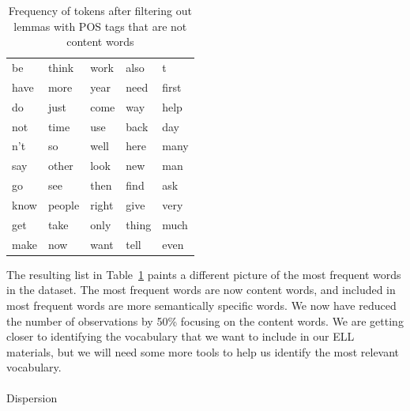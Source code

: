 \documentclass[
  letterpaper,
  krantz1]{latex/krantz-mod}
\makeatletter
\let\oldparagraph\paragraph
\renewcommand{\paragraph}{
    \@ifstar
      \xxxParagraphStar
      \xxxParagraphNoStar
  }
\newcommand{\xxxParagraphStar}[1]{\oldparagraph*{#1}\mbox{}}
\newcommand{\xxxParagraphNoStar}[1]{\oldparagraph{#1}\mbox{}}
\theoremstyle{definition}
\theoremstyle{definition}
\theoremstyle{remark}
\makeatother
\begin{document}
\begin{longtable}[]{@{}
  >{\raggedright\arraybackslash}p{}
  >{\raggedright\arraybackslash}p{}
  >{\raggedright\arraybackslash}p{}
  >{\raggedright\arraybackslash}p{}
  >{\raggedright\arraybackslash}p{}@{}}

\caption{\label{tbl-explore-masc-filter-pos}Frequency of tokens after
filtering out lemmas with POS tags that are not content words}

\tabularnewline

\toprule\noalign{}
\endhead
\bottomrule\noalign{}
\endlastfoot
be & think & work & also & t \\
have & more & year & need & first \\
do & just & come & way & help \\
not & time & use & back & day \\
n't & so & well & here & many \\
say & other & look & new & man \\
go & see & then & find & ask \\
know & people & right & give & very \\
get & take & only & thing & much \\
make & now & want & tell & even \\

\end{longtable}

The resulting list in Table~\ref{tbl-explore-masc-filter-pos} paints a
different picture of the most frequent words in the dataset. The most
frequent words are now content words, and included in most frequent
words are more semantically specific words. We now have reduced the
number of observations by 50\% focusing on the content words. We are
getting closer to identifying the vocabulary that we want to include in
our ELL materials, but we will need some more tools to help us identify
the most relevant vocabulary.

\pagebreak

\paragraph{Dispersion}\label{sec-explore-frequency-dispersion}

\vspace{-1em}
\end{document}
